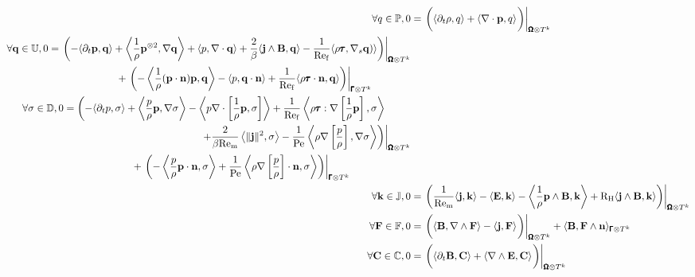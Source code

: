     \begin{align}
        \forall q \in \bbP,  0  &=  \left.\left(\langle\partial_{t}\rho, q\rangle + \langle\nabla\cdot\bfp, q\rangle\tall\right)\right|_{\bfOmega\otimes T^{k}}  \\
        \begin{split}
            \forall \bfq \in \bbU,  0  &=  \left.\left(- \langle\partial_{t}\bfp, \bfq\rangle + \left\langle\frac{1}{\rho}\bfp^{\otimes 2}, \nabla\bfq\right\rangle + \langle p, \nabla\cdot\bfq\rangle + \frac{2}{\beta}\langle\bfj\wedge\bfB, \bfq\rangle - \frac{1}{\rmRef}\langle\rho\bftau, \nabla_{s}\bfq)\rangle\right)\right|_{\bfOmega\otimes T^{k}}  \\
            &\;\;\;\;\;\;\;\;\;\;\;\;\;\;\;\;\;\;\;\;\;\;\;\;  + \left.\left(- \left\langle\frac{1}{\rho}(\bfp\cdot\bfn)\bfp, \bfq\right\rangle - \langle p, \bfq\cdot\bfn\rangle + \frac{1}{\rmRef}\langle\rho\bftau\cdot\bfn, \bfq\rangle\right)\right|_{\bfGamma\otimes T^{k}}
        \end{split}  \\
        \begin{split}
            \forall \sigma \in \bbD,  0  &=  \left(- \langle\partial_{t}p, \sigma\rangle + \left\langle\frac{p}{\rho}\bfp, \nabla\sigma\right\rangle - \left\langle p\nabla\cdot\left[\frac{1}{\rho}{\bfp}, \sigma\right]\right\rangle + \frac{1}{\rmRef}\left\langle\rho\bftau:\nabla\left[\frac{1}{\rho}\bfp\right], \sigma\right\rangle\right.  \\
            &\;\;\;\;\;\;\;\;\;\;\;\;\;\;\;\;\;\;\;\;\;\;\;\;\;\;\;\;\;\;\;\;\;\;\;\;\;\;\;\;\;\;\;\;\;\;\;\;\left.\left.+ \frac{2}{\beta\rmRem}\left\langle\|\bfj\|^{2}, \sigma\right\rangle - \frac{1}{\rmPe}\left\langle\rho\nabla\left[\frac{p}{\rho}\right], \nabla\sigma\right\rangle\right)\right|_{\bfOmega\otimes T^{k}}  \\
            &\;\;\;\;\;\;\;\;\;\;\;\;\;\;\;\;\;\;\;\;\;\;\;\;  + \left.\left(- \left\langle\frac{p}{\rho}\bfp\cdot\bfn, \sigma\right\rangle + \frac{1}{\rmPe}\left\langle\rho\nabla\left[\frac{p}{\rho}\right]\cdot\bfn, \sigma\right\rangle\right)\right|_{\bfGamma\otimes T^{k}}
        \end{split}  \\
        \forall \bfk \in \bbJ,  0  &=  \left.\left(\frac{1}{\rmRem}\langle\bfj, \bfk\rangle - \langle\bfE, \bfk\rangle - \left\langle\frac{1}{\rho}\bfp\wedge\bfB, \bfk\right\rangle + \rmRH\langle\bfj\wedge\bfB, \bfk\rangle\right)\right|_{\bfOmega\otimes T^{k}}  \\
        \forall \bfF \in \bbF,  0  &=  \left.\left(\langle\bfB, \nabla\wedge\bfF\rangle - \langle\bfj, \bfF\rangle\tall\right)\right|_{\bfOmega\otimes T^{k}} + \langle\bfB, \bfF\wedge\bfn\rangle_{\bfGamma\otimes T^{k}}  \\
        \forall \bfC \in \bbC,  0  &=  \left.\left(\langle\partial_{t}\bfB, \bfC\rangle + \langle\nabla\wedge\bfE, \bfC\rangle\tall\right)\right|_{\bfOmega\otimes T^{k}}
    \end{align}
